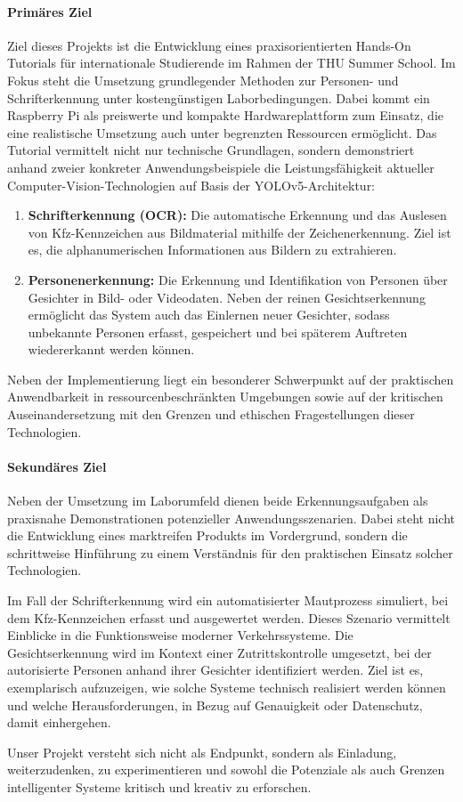 \paragraph{Primäres Ziel}Ziel dieses Projekts ist die Entwicklung eines praxisorientierten Hands-On Tutorials für internationale Studierende im Rahmen der THU Summer School. Im Fokus steht die Umsetzung grundlegender Methoden zur Personen- und Schrifterkennung unter kostengünstigen Laborbedingungen. Dabei kommt ein Raspberry Pi als preiswerte und kompakte Hardwareplattform zum Einsatz, die eine realistische Umsetzung auch unter begrenzten Ressourcen ermöglicht. 
Das Tutorial vermittelt nicht nur technische Grundlagen, sondern demonstriert anhand zweier konkreter Anwendungsbeispiele die Leistungsfähigkeit aktueller Computer-Vision-Technologien auf Basis der YOLOv5-Architektur:
\begin{enumerate}
    \item\textbf{Schrifterkennung (OCR):} Die automatische Erkennung und das Auslesen von Kfz-Kennzeichen aus Bildmaterial mithilfe der Zeichenerkennung. Ziel ist es, die alphanumerischen Informationen aus Bildern zu extrahieren.
    \item\textbf{Personenerkennung:} Die Erkennung und Identifikation von Personen über Gesichter in Bild- oder Videodaten. Neben der reinen Gesichtserkennung ermöglicht das System auch das Einlernen neuer Gesichter, sodass unbekannte Personen erfasst, gespeichert und bei späterem Auftreten wiedererkannt werden können.
\end{enumerate}
    Neben der Implementierung liegt ein besonderer Schwerpunkt auf der praktischen Anwendbarkeit in ressourcenbeschränkten Umgebungen sowie auf der kritischen Auseinandersetzung mit den Grenzen und ethischen Fragestellungen dieser Technologien. 
\paragraph{Sekundäres Ziel}Neben der Umsetzung im Laborumfeld dienen beide Erkennungsaufgaben als praxisnahe Demonstrationen potenzieller Anwendungsszenarien. Dabei steht nicht die Entwicklung eines marktreifen Produkts im Vordergrund, sondern die schrittweise Hinführung zu einem Verständnis für den praktischen Einsatz solcher Technologien. 

Im Fall der Schrifterkennung wird ein automatisierter Mautprozess simuliert, bei dem Kfz-Kennzeichen erfasst und ausgewertet werden. Dieses Szenario vermittelt Einblicke in die Funktionsweise moderner Verkehrssysteme. 
Die Gesichtserkennung wird im Kontext einer Zutrittskontrolle umgesetzt, bei der autorisierte Personen anhand ihrer Gesichter identifiziert werden. Ziel ist es, exemplarisch aufzuzeigen, wie solche Systeme technisch realisiert werden können und welche Herausforderungen, in Bezug auf Genauigkeit oder Datenschutz, damit einhergehen. 

Unser Projekt versteht sich nicht als Endpunkt, sondern als Einladung, weiterzudenken, zu experimentieren und sowohl die Potenziale als auch Grenzen intelligenter Systeme kritisch und kreativ zu erforschen. 